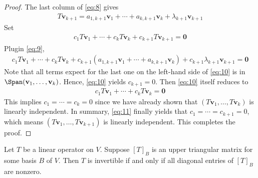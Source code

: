 \documentclass[thmcnt=section, color=blue, 12pt]{my-elegantbook}
\begin{document}
\begin{proof}
    \par The last column of \eqref{eq:8} gives
    \begin{align}
        T \mathbf{v}_{k+1}
        = a_{1,k+1} \mathbf{v}_1 
        + \cdots 
        + a_{k,k+1} \mathbf{v}_k
        + \lambda_{k+1} \mathbf{v}_{k+1}
        \label{eq:9}
    \end{align}
    Set 
    \begin{align}
        c_1 T \mathbf{v}_1 + \cdots + c_k T \mathbf{v}_k + c_{k+1} T \mathbf{v}_{k+1} = \mathbf{0}
        \label{eq:11}
    \end{align}
    Plugin \eqref{eq:9},
    \begin{align}
        c_1 T \mathbf{v}_1 + \cdots 
        + c_k T \mathbf{v}_k 
        + c_{k+1} (
            a_{1,k+1} \mathbf{v}_1 
            + \cdots 
            + a_{k,k+1} \mathbf{v}_k
        ) + c_{k+1} \lambda_{k+1} \mathbf{v}_{k+1}
        = \mathbf{0}
        \label{eq:10}
    \end{align}
    Note that all terms expect for the last one on the left-hand side of \eqref{eq:10} is in $\Span(\mathbf{v}_1, \ldots, \mathbf{v}_k)$. Hence, \eqref{eq:10} yields $c_{k+1} = 0$. Then \eqref{eq:10} itself reduces to 
    \begin{align*}
        c_1 T \mathbf{v}_1 + \cdots 
        + c_k T \mathbf{v}_k 
        = \mathbf{0}
    \end{align*}
    This implies $c_1 = \cdots = c_k = 0$ since we have already shown that $(T \mathbf{v}_1, \ldots, T \mathbf{v}_k)$ is linearly independent. In summary, \eqref{eq:11} finally yields that $c_1 = \cdots = c_{k+1} = 0$, which means $(T \mathbf{v}_1, \ldots, T \mathbf{v}_{k+1})$ is linearly independent. This completes the proof.
\end{proof}


\begin{proposition} \label{pro:3}
    Let $T$ be a linear operator on $V$. Suppose $[T]_B$ is an upper triangular matrix for some basis $B$ of $V$. Then $T$ is invertible if and only if all diagonal entries of $[T]_B$ are nonzero.
\end{proposition}
\end{document}
